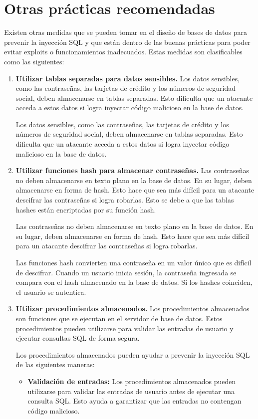 \documentclass[11pt]{report}
\begin{document}
\section{Otras prácticas recomendadas}
Existen otras medidas que se pueden tomar en el diseño de bases de datos para prevenir la inyección SQL y que están dentro de las buenas prácticas para poder 
evitar exploits o funcionamientos inadecuados. Estas medidas son clasificables como las siguientes:
\begin{enumerate}
  \item \textbf{Utilizar tablas separadas para datos sensibles.} Los datos sensibles, como las contraseñas, las tarjetas
  de crédito y los números de seguridad social, deben almacenarse en tablas separadas. Esto dificulta que un atacante 
  acceda a estos datos si logra inyectar código malicioso en la base de datos.

  Los datos sensibles, como las contraseñas, las tarjetas de crédito y los números de seguridad social, deben almacenarse
  en tablas separadas. Esto dificulta que un atacante acceda a estos datos si logra inyectar código malicioso en la base
  de datos.
  
  \item \textbf{Utilizar funciones hash para almacenar contraseñas.} Las contraseñas no deben almacenarse en texto plano en
  la base de datos. En su lugar, deben almacenarse en forma de hash. Esto hace que sea más difícil para un atacante descifrar
  las contraseñas si logra robarlas. Esto se debe a que las tablas hashes están encriptadas por su función hash.

  Las contraseñas no deben almacenarse en texto plano en la base de datos. En su lugar, deben almacenarse en forma de hash.
  Esto hace que sea más difícil para un atacante descifrar las contraseñas si logra robarlas.
  
  Las funciones hash convierten una contraseña en un valor único que es difícil de descifrar. Cuando un usuario inicia sesión,
  la contraseña ingresada se compara con el hash almacenado en la base de datos. Si los hashes coinciden, el usuario se autentica.
  
  \item \textbf{Utilizar procedimientos almacenados.} Los procedimientos almacenados son funciones que se ejecutan en el servidor
  de base de datos. Estos procedimientos pueden utilizarse para validar las entradas de usuario y ejecutar consultas SQL de forma segura.
  
  Los procedimientos almacenados pueden ayudar a prevenir la inyección SQL de las siguientes maneras:
  \begin{itemize}
    \item \textbf{Validación de entradas:} Los procedimientos almacenados pueden utilizarse para validar las entradas de usuario antes de
    ejecutar una consulta SQL. Esto ayuda a garantizar que las entradas no contengan código malicioso.
    

\end{itemize}
\end{enumerate}
\end{document}
